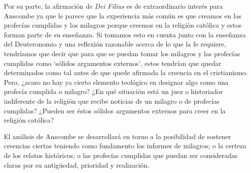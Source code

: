 Por su parte, la afirmación de \emph{Dei Filius} es de extraordinario interés para Anscombe ya que le parece que la experiencia más común es que creamos en las profecías cumplidas y los milagros porque creemos en la religión católica y estos forman parte de su enseñanza. Si tomamos esto en cuenta junto con la enseñanza del Deuteronomio y una reflexión razonable acerca de lo que la fe requiere, tendríamos que decir que para que se puedan tomar los milagros y las profecías cumplidas como \enquote*{sólidos argumentos externos}, estos tendrían que quedar determinados como tal antes de que quede afirmada la creencia en el cristianismo. Pero, ¿acaso no hay ya cierto elemento teológico en designar algo como una profecía cumplida o milagro? ¿En qué situación está un juez o historiador indiferente de la religión que recibe noticias de un milagro o de profecías cumplidas? ¿Pueden ser éstos sólidos argumentos externos para creer en la religión católica?

El análisis de Anscombe se desarrollará en torno a la posibilidad de sostener creencias ciertas teniendo como fundamento los informes de milagros; o la certeza de los relatos históricos; o las profecías cumplidas que puedan ser consideradas claras por su antigüedad, prioridad y realización.

